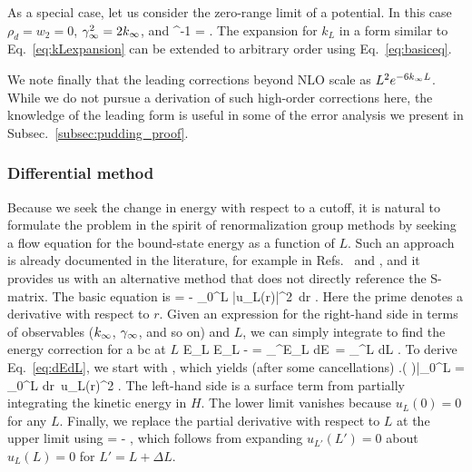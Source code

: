 	As a special case, let us consider the zero-range limit of a
	potential. In this case $\rho_d = w_2 = 0$, $\gamma_\infty^2 = 2k_{\infty}$, and
	\beq
	   [s_0(ik_L)]^{-1} = \;.
	\eeq
	The expansion for $k_L$ in a form similar to Eq.~\eqref{eq:kLexpansion}
	can be extended to arbitrary order using Eq.~\eqref{eq:basiceq}.

	We note finally that the leading corrections beyond NLO scale as $L^2
	e^{-6k_{\infty} L}$. While we do not pursue a derivation of such high-order
	corrections here, the knowledge of the leading form is useful in some of
	the error analysis we present in Subsec.~\ref{subsec:pudding_proof}.


	\subsubsection{Differential method}

	Because we seek the change in energy with respect to a cutoff, it is
	natural to formulate the problem in the spirit of renormalization
	group methods by seeking a flow equation for the bound-state energy as
	a function of $L$.  Such an approach is already documented in the
	literature, for example in Refs.~\cite{Arteca1984} and
	\cite{Fernandez1981}, and it provides us with an alternative method that
	does not directly reference the S-matrix.  The basic equation is
	\beq
	   = - 
		{\int_0^L |u_L(r)|^2\, dr}
	  \;.
	  \label{eq:dEdL}
	\eeq
	Here the prime denotes a derivative with respect to $r$.  Given an
	expression for the right-hand side in terms of observables ($k_{\infty}$,
	$\gamma_\infty$, and so on) and $L$, we can simply integrate to find the energy
	correction for a bc at $L$
	\beq
	  \Delta E_L \equiv E_L - \Einf = \int_{\Einf}^{E_L}\! dE\,
	     = \int_\infty^L\!  dL
	     \;.
	\eeq
	To derive Eq.~\eqref{eq:dEdL}, we start with
	\beq
	  \left [
	   \int_0^L u_L(r) H u_L(r)\, dr = E_L \int_0^L\! dr\, u_L(r)^2
	  \right]
	  \;,
	\eeq
	which yields (after some cancellations)
	\beq
	     \left.\left( 
	         \right)\right|_0^L
	   =
	   \int_0^L\! dr\, u_L(r)^2
	         \;.
	         \label{eq:DeltaEL}
	\eeq
	The left-hand side is a surface term from partially integrating the
	kinetic energy in $H$.  The lower limit vanishes because $u_L(0) = 0$
	for any $L$.  Finally, we replace the partial derivative with respect
	to $L$ at the upper limit using
	\beq
	    = - 
	   \;,
	\eeq
	which follows from expanding $u_{L'}(L') = 0$ about $u_{L}(L) = 0$ for
	$L' = L + \Delta L$.

